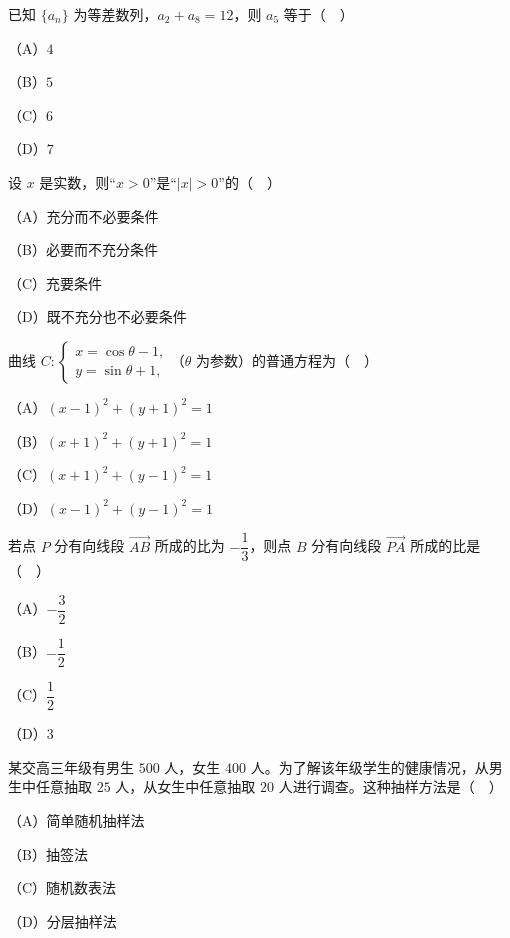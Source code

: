 


\begin{question}
已知 $\{a_n\}$ 为等差数列，$a_2+a_8=12$，则 $a_5$ 等于（　）

（A）$4$

（B）$5$

（C）$6$

（D）$7$

\end{question}
\begin{question}
设 $x$ 是实数，则“$x>0$”是“$|x|>0$”的（　）

（A）充分而不必要条件

（B）必要而不充分条件

（C）充要条件

（D）既不充分也不必要条件

\end{question}
\begin{question}
曲线 $C:\begin{cases}x=\cos\theta-1,\\ y=\sin\theta+1,\end{cases}$（$\theta$ 为参数）的普通方程为（　）

（A）$(x-1)^2+(y+1)^2=1$

（B）$(x+1)^2+(y+1)^2=1$

（C）$(x+1)^2+(y-1)^2=1$

（D）$(x-1)^2+(y-1)^2=1$

\end{question}
\begin{question}
若点 $P$ 分有向线段 $\overrightarrow{AB}$ 所成的比为 $-\dfrac13$，则点 $B$ 分有向线段 $\overrightarrow{PA}$ 所成的比是（　）

（A）$-\dfrac32$

（B）$-\dfrac12$

（C）$\dfrac12$

（D）$3$

\end{question}
\begin{question}
某交高三年级有男生 $500$ 人，女生 $400$ 人。为了解该年级学生的健康情况，从男生中任意抽取 $25$ 人，从女生中任意抽取 $20$ 人进行调查。这种抽样方法是（　）

（A）简单随机抽样法

（B）抽签法

（C）随机数表法

（D）分层抽样法

\end{question}
